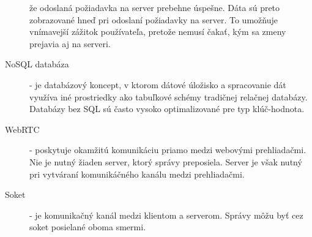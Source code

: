 \begin{description}
že odoslaná požiadavka na server prebehne úspešne. Dáta sú preto zobrazované hneď pri odoslaní
požiadavky na server. To umožňuje vnímavejší zážitok používateľa, pretože nemusí čakať, kým sa
zmeny prejavia aj na serveri.
\item [NoSQL databáza] - je databázový koncept, v ktorom dátové úložisko a spracovanie dát využíva
iné prostriedky ako tabuľkové schémy tradičnej relačnej databázy. Databázy bez SQL sú často vysoko
optimalizované pre typ klúč-hodnota.
\item [WebRTC] - poskytuje okamžitú komunikáciu priamo medzi webovými prehliadačmi. Nie je nutný
žiaden server, ktorý správy preposiela. Server je však nutný pri vytváraní komunikáčného kanálu
medzi prehliadačmi.
\item [Soket] - je komunikačný kanál medzi klientom a serverom. Správy môžu byť cez soket posielané
oboma smermi.
\end{description}
